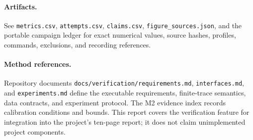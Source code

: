 \documentclass[10pt]{article}
\begin{document}
\paragraph{Artifacts.} See \texttt{metrics.csv}, \texttt{attempts.csv}, \texttt{claims.csv},
\texttt{figure\_sources.json}, and the portable campaign ledger for exact numerical values,
source hashes, profiles, commands, exclusions, and recording references.
\paragraph{Method references.} Repository documents \texttt{docs/verification/requirements.md},
\texttt{interfaces.md}, and \texttt{experiments.md} define the executable requirements,
finite-trace semantics, data contracts, and experiment protocol. The M2 evidence index records
calibration conditions and bounds. This report covers the verification feature for integration
into the project's ten-page report; it does not claim unimplemented project components.
\end{document}
